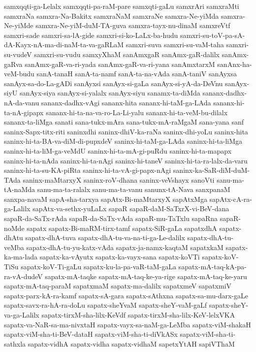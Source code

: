 {samxqqti-ga-Lelalx
samxqqti-pa-raM-pare
samxqti-gaLu
samxrAri
samxraMti
samxraNa
samxra-Na-Bakitx
samxraNaM
samxraNe
samxra-Ne-yiMda
samxra-Ne-yiMde
samxra-Ne-yiM-duM-TA-guva
samxra-tayx-nu-dinaM
samxreVtf
samxri-sade
samxri-sa-lA-gide
samxri-si-ko-LaLx-ba-hudu
samxri-su-toV-pa-sA-dA-Kayx-nA-ma-di-naM-ta-va-gaRLaM
samxri-suva
samxri-su-vaM-taha
samxri-su-vudeV
samxri-su-vudu
samxyXhaM
sanAmxgaR
sanAmx-gaR-dalilx
sanAmx-gaRva
sanAmx-gaR-va-ri-yada
sanAmx-gaR-va-ri-yana
sanAmxtarxM
sanAnx-ha-veM-budu
sanA-tanaH
sanA-ta-namf
sanA-ta-na-vAda
sanA-taniV
sanAyxsa
sanAyx-sa-do-La-gADi
sanAyxsi
sanAyx-si-gaLa
sanAyx-si-yA-da-DeVnu
sanAyx-siyU
sanAyx-siya
sanAyx-si-yalalx
sanAyx-siyu
sanamx-ta-diMda
sananx-dadhx-nA-da-vanu
sananx-dadhx-vAgi
sananx-hita
sananx-hi-taM-ga-LAda
sananx-hi-ta-nA-gipapx
sananx-hi-ta-na-va-ro-La-Li-yalu
sananx-hi-ta-veM-bu-dilalx
sananx-ta-liMga
sanati
sana-tukx-mAra
sana-tukx-mA-raMgaM
sana-yana
sanf
saninx-Sapx-titx-riti
saninxdhi
saninx-dhiV-ka-raNa
saninx-dhi-yoLu
saninx-hita
saninx-hi-ta-BA-va-diM-di-pupxdeV
saninx-hi-taM-ga-LAda
saninx-hi-ta-liMga
saninx-hi-ta-liM-ga-veMdU
saninx-hi-ta-mA-gi-puRdu
saninx-hi-ta-mapapx
saninx-hi-ta-nAda
saninx-hi-ta-nAgi
saninx-hi-taneV
saninx-hi-ta-ra-lalx-da-varu
saninx-hi-ta-su-KA-piRta
saninx-hi-ta-vA-gi-papx-nAgi
saninx-ka-SaR-diM-duM-TAda
saninx-maMtarxyX
saninx-roV-dhana
saninx-veVshayx
sanoVti
sanu-ma-tA-naMda
sanu-ma-ta-ralalx
sanu-ma-ta-vanu
sanunx-tA-Nava
sanxpanaM
sanxpa-navaM
sapA-sha-tarxya
sapAtx-Bi-maMtarxyX
sapAtxMga
sapAtx-cA-ra-ga-Lalilx
sapAtx-va-sethx-yuLaLx
sapaR
sapaR-daM-SaTxrX-vi-BeV-dana
sapaR-da-SaTx-rAda
sapaR-da-SaTx-vAda
sapaR-mu-TaTxlu
sapaRna
sapaR-noMde
sapatx
sapatx-Bi-maRM-tirx-tamf
sapatx-SiR-gaLa
sapatxdhA
sapatx-dhAtu
sapatx-dhA-tuva
sapatx-dhA-tu-va-na-ti-ga-Le-dalilx
sapatx-dhA-tu-veMba
sapatx-dhA-tu-yu-katx-vAda
sapatx-ja-namx-kaqtaM
sapatxkaM
sapatx-ka-ma-lada
sapatx-ka-vAyutx
sapatx-ka-vayx-sana
sapatx-koVTi
sapatx-koV-TiSu
sapatx-koV-Ti-gaLu
sapatx-ku-la-pa-vaR-taM-gaLa
sapatx-mA-taq-kA-pa-ra-vA-dudeV
sapatx-mA-taqke
sapatx-mA-taq-ke-ya-rige
sapatx-mA-taq-ke-yaru
sapatx-mA-taq-paraM
sapatxmaM
sapatx-ma-dalilx
sapatxmeV
sapatxmiV
sapatx-parx-kA-ra-kamf
sapatx-sA-gara
sapatx-sAthxna
sapatx-sa-mu-darx-gaLe
sapatx-savx-ra-hA-ra-doLu
sapatx-sheYvaM
sapatx-sheY-vaM-gaLf
sapatx-sheY-va-ga-Lalilx
sapatx-tirxM-sha-lilx-KeVdf
sapatx-tirxM-sha-lilx-KeV-lelxVKA
sapatx-va-NaR-sa-ma-nivxtaH
sapatx-vayx-sa-naM-ga-LeMba
sapatx-viM-shakaH
sapatx-viM-sha-ti-BeV-dataH
sapatx-viM-sha-ti-diVkASx
sapatx-viM-sha-ti-sathxla
sapatx-vidhA
sapatx-vidha
sapatx-vidhaM
sapetxYtAH
sapiVThaM
}
